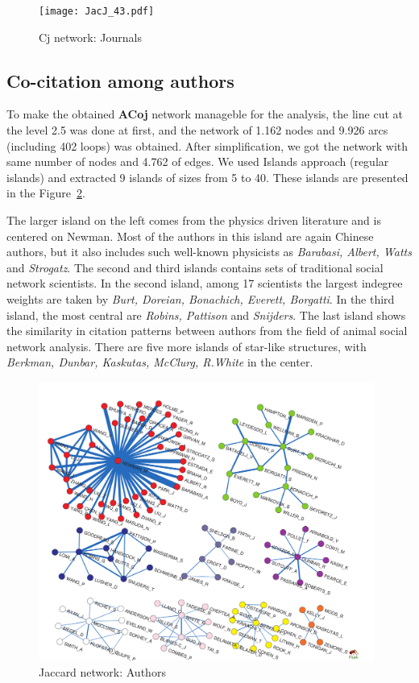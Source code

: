 \documentclass[11pt]{article} %
\begin{document}
\begin{figure}
\begin{center}
\texttt{[image: JacJ\_43.pdf]}
\end{center}
\caption{Cj network: Journals} \label{jacj}
\end{figure}

\subsection{Co-citation among authors} 

To make the obtained \textbf{ACoj} network manageble for the analysis, the line cut at the level 2.5 was done at first, and the network of 1.162 nodes and  9.926 arcs (including 402 loops) was obtained. After simplification, we got the network with same number of nodes and 4.762 of edges. We used Islands approach (regular islands) and extracted 9 islands of sizes from 5 to 40. These islands are presented in the Figure~\ref{jaca}.  \medskip 

The larger island on the left comes from the physics driven literature and is centered on Newman. Most of the authors in this island are again Chinese authors, but it also includes such well-known physicists as \textit{Barabasi, Albert, Watts} and \textit{Strogatz}. The second and third islands contains sets of traditional social network scientists. In the second island, among 17 scientists the largest indegree weights are taken by \textit{Burt, Doreian, Bonachich, Everett, Borgatti}. In the third island, the most central are \textit{Robins, Pattison} and \textit{Snijders}. The last island shows the similarity in citation patterns between authors from the field of animal social network analysis. There are five more islands of star-like structures, with \textit{Berkman, Dunbar, Kaskutas, McClurg, R.White} in the center. 

\begin{figure}
\begin{center}
\includegraphics[width=110mm]{JacAu.pdf}
\end{center}
\caption{Jaccard network: Authors} \label{jaca}
\end{figure}
\end{document}
